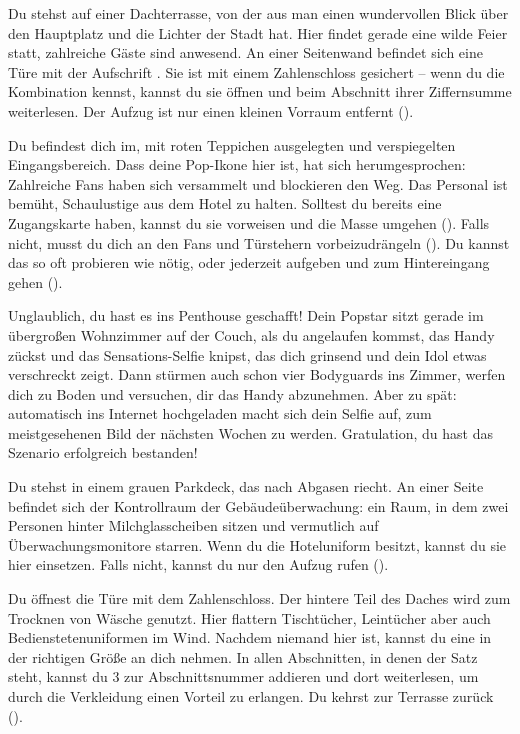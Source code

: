 {	%
	Du stehst auf einer Dachterrasse, von der aus man einen wundervollen Blick über den Hauptplatz und die Lichter der Stadt hat. Hier findet gerade eine wilde Feier statt, zahlreiche Gäste sind anwesend. An einer Seitenwand befindet sich eine Türe mit der Aufschrift . Sie ist mit einem Zahlenschloss gesichert -- wenn du die Kombination kennst, kannst du sie öffnen und beim Abschnitt ihrer Ziffernsumme weiterlesen. Der Aufzug ist nur einen kleinen Vorraum entfernt ().

	Du befindest dich im, mit roten Teppichen ausgelegten und verspiegelten Eingangsbereich. Dass deine Pop-Ikone hier ist, hat sich herumgesprochen: Zahlreiche Fans haben sich versammelt und blockieren den Weg. Das Personal ist bemüht, Schaulustige aus dem Hotel zu halten. Solltest du bereits eine Zugangskarte haben, kannst du sie vorweisen und die Masse umgehen (). Falls nicht, musst du dich an den Fans und Türstehern vorbeizudrängeln (). Du kannst das so oft probieren wie nötig, oder jederzeit aufgeben und zum Hintereingang gehen ().

	Unglaublich, du hast es ins Penthouse geschafft! Dein Popstar sitzt gerade im übergroßen Wohnzimmer auf der Couch, als du angelaufen kommst, das Handy zückst und das Sensations-Selfie knipst, das dich grinsend und dein Idol etwas verschreckt zeigt. Dann stürmen auch schon vier Bodyguards ins Zimmer, werfen dich zu Boden und versuchen, dir das Handy abzunehmen. Aber zu spät: automatisch ins Internet hochgeladen macht sich dein Selfie auf, zum meistgesehenen Bild der nächsten Wochen zu werden. Gratulation, du hast das Szenario erfolgreich bestanden!

	Du stehst in einem grauen Parkdeck, das nach Abgasen riecht. An einer Seite befindet sich der Kontrollraum der Gebäudeüberwachung: ein Raum, in dem zwei Personen hinter Milchglasscheiben sitzen und vermutlich auf Überwachungsmonitore starren. Wenn du die Hoteluniform besitzt, kannst du sie hier einsetzen. Falls nicht, kannst du nur den Aufzug rufen ().

	Du öffnest die Türe mit dem Zahlenschloss. Der hintere Teil des Daches wird zum Trocknen von Wäsche genutzt. Hier flattern Tischtücher, Leintücher aber auch Bedienstetenuniformen im Wind. Nachdem niemand hier ist, kannst du eine in der richtigen Größe an dich nehmen. In allen Abschnitten, in denen der Satz  steht, kannst du 3 zur Abschnittsnummer addieren und dort weiterlesen, um durch die Verkleidung einen Vorteil zu erlangen. Du kehrst zur Terrasse zurück ().

}
